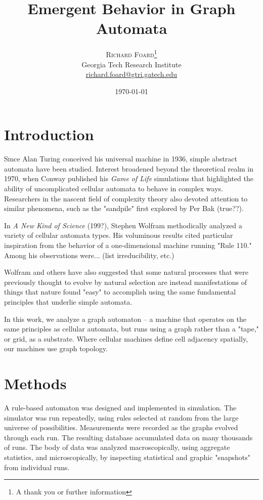 \documentclass[twoside,twocolumn]{article}
\title{Emergent Behavior in Graph Automata} %
\author{%
\textsc{Richard Foard}\thanks{A thank you or further information} \\[1ex] %
\normalsize Georgia Tech Research Institute \\ %
\normalsize \href{mailto:richard.foard@gtri.gatech.edu}{richard.foard@gtri.gatech.edu} %
}
\date{\today} %
\begin{document}
\maketitle


\section{Introduction}

\lettrine[nindent=0em,lines=3]{S} ince Alan Turing conceived his
universal machine in 1936, simple abstract automata have been studied. Interest broadened
beyond the theoretical realm in 1970,
when Conway published his \textit{Game of Life} simulations that highlighted the ability
of uncomplicated cellular automata to behave in complex ways. Researchers in the
nascent field of complexity theory also devoted attention to similar phenomena, such as the
"sandpile" first explored by Per Bak (true??).

In \textit{A New Kind of Science} (199?), Stephen Wolfram methodically analyzed
a variety of cellular automata types. His voluminous results cited particular inspiration from the
behavior of a one-dimensional machine running "Rule 110." Among his observations were... (list
irreducibility, etc.)

Wolfram and others have also suggested that some natural processes that were
previously thought to evolve by natural selection are instead
manifestations of things that nature found "easy" to accomplish using
the same fundamental principles that underlie simple automata.

In this work, we analyze a graph automaton -- a machine that operates on the same principles as
cellular automata, but runs using a graph rather than a "tape," or grid, as a substrate.
Where cellular machines define cell adjacency spatially, our machines use graph topology.


\section{Methods}

A rule-based automaton was designed and implemented in simulation. The simulator was run repeatedly, using rules
selected at random from the large universe of possibilities. Measurements were recorded as the graphs
evolved through each run. The resulting database accumulated data on many thousands of runs. The body of data
was analyzed macroscopically, using aggregate
statistics, and microscopically, by inspecting statistical and graphic "snapshots" from individual runs.
\end{document}

